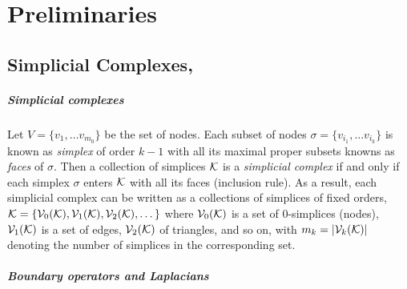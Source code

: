 \chapter{ Preliminaries }

\section{ Simplicial Complexes, \cite{Lim15} }
%
%

\paragraph{Simplicial complexes}

Let \( V = \{ v_1, \dots v_{m_0} \} \) be the set of nodes. Each subset of nodes \( \sigma = \{ v_{i_1}, \dots v_{i_k} \} \) is known as \emph{simplex} of order \( k - 1 \) with all its maximal proper subsets knowns as \emph{faces} of \( \sigma \). Then a collection of simplices \( \mathcal{K} \) is a \emph{simplicial complex} if and only if each simplex \( \sigma \) enters \( \mathcal{K} \) with all its faces (inclusion rule). As a result, each simplicial complex can be written as a collections of simplices of fixed orders, \( \mathcal{K} = \left\{ \mathcal{V}_{0}(\mathcal{K}), \mathcal{V}_{1}(\mathcal{K}), \mathcal{V}_{2}(\mathcal{K}), \dots \right\} \) where \( \mathcal{V}_{0}(\mathcal{K}) \) is a set of \(0\)-simplices (nodes), \( \mathcal{V}_{1}(\mathcal{K}) \) is a set of edges, \( \mathcal{V}_{2}(\mathcal{K}) \) of triangles, and so on, with \( m_k = | \mathcal{V}_{k}(\mathcal{K}) | \) denoting the number of simplices in the corresponding set.

\paragraph{ Boundary operators and Laplacians }

